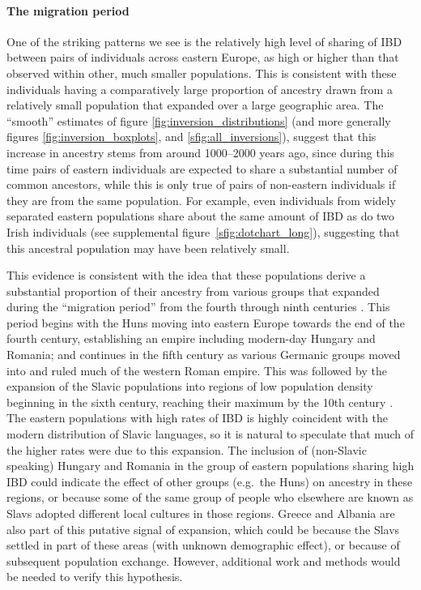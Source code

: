 \documentclass{article}
\begin{document}
\paragraph{The migration period}
One of the striking patterns we see is the relatively high level of 
sharing of IBD between pairs of individuals across eastern Europe,
as high or higher than that observed within other, much smaller populations.
This is consistent with these individuals having a comparatively large proportion of ancestry 
drawn from a relatively small population 
that expanded over a large geographic area.
The ``smooth'' estimates of figure \ref{fig:inversion_distributions}
(and more generally figures \ref{fig:inversion_boxplots}, and \ref{sfig:all_inversions}), 
suggest that this increase in ancestry stems from around 1000--2000 years ago,
since during this time pairs of eastern individuals are expected to share a substantial number of common ancestors,
while this is only true of pairs of non-eastern individuals if they are from the same population.
For example, even individuals from widely separated eastern populations share about the same amount of IBD
as do two Irish individuals (see supplemental figure~\ref{sfig:dotchart_long}),
suggesting that this ancestral population may have been relatively small.


This evidence is consistent with the idea that these populations 
derive a substantial proportion of their ancestry from 
various groups that expanded during the ``migration period'' 
from the fourth through ninth centuries \citep{davies2010europe}.
This period begins with the Huns moving into eastern Europe towards the end of the fourth century,
establishing an empire including modern-day Hungary and Romania;
and continues in the fifth century as various Germanic groups moved into and ruled much of the western Roman empire.
This was followed by the expansion of the Slavic populations into regions of low population density beginning in the sixth century, 
reaching their maximum by the 10th century \citep{barford2001early}.
The eastern populations with high rates of IBD is highly coincident with the modern distribution of Slavic languages,
so it is natural to speculate that much of the higher rates were due to this expansion.
The inclusion of (non-Slavic speaking) Hungary and Romania in the group of eastern populations sharing high IBD
could indicate the effect of other groups (e.g.\ the Huns) on ancestry in these regions,
or because some of the same group of people who elsewhere are known as Slavs adopted different local cultures in those regions.
Greece and Albania are also part of this putative signal of expansion,
which could be because the Slavs settled in part of these areas (with unknown demographic effect),
or because of subsequent population exchange.
However, additional work and methods would be needed to verify this hypothesis.
\end{document}
